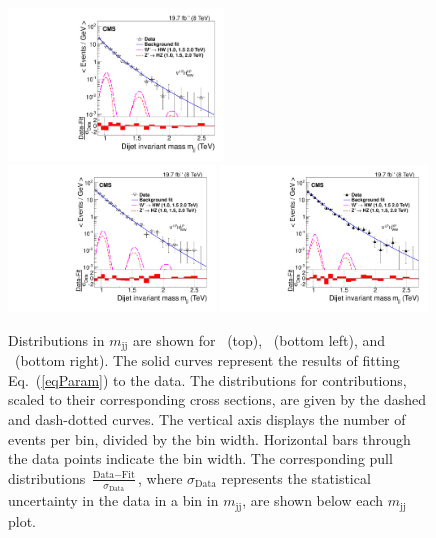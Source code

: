 \begin{figure}[th!b]
\begin{center}
\includegraphics[width=0.51\textwidth]{EXO-14-009/HqqqqZqqfigs/FITS/HwwVqqFitAndPullHighP.pdf}
\includegraphics[width=0.49\textwidth]{EXO-14-009/HqqqqZqqfigs/FITS/HwwVqqFitAndPullLowH.pdf}
\includegraphics[width=0.49\textwidth]{EXO-14-009/HqqqqZqqfigs/FITS/HwwVqqFitAndPullLowV.pdf}
\end{center}
\caption{
Distributions in $m_\mathrm{jj}$ are shown for
   \HWWHP\ (top), \HWWLPH\ (bottom left), and 
   \HWWLPV\ (bottom right).  
    The solid curves represent the
   results of fitting Eq.~(\ref{eqParam}) to the data. The
   distributions for \HwwVqq 
   contributions, scaled to their corresponding cross sections, are
   given by the dashed and dash-dotted curves. 
   The vertical axis displays the number of events per bin, divided
   by the bin width.
Horizontal bars
through the data points indicate the bin width. 
The corresponding pull
   distributions
   $\frac{\text{Data}-\text{Fit}}{\sigma_{\text{Data}}}$, where
   $\sigma_{\text{Data}}$ represents the statistical uncertainty in
   the data in a bin in $m_\mathrm{jj}$, are shown below each
   $m_\mathrm{jj}$ plot. }
\label{fig:HwwZqqBG}
\end{figure}




\clearpage

